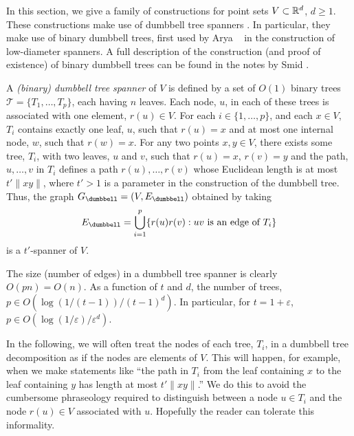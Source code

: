 \documentclass{patmorin}
\newcommand{\eps}{\varepsilon}
\begin{document}
In this section, we give a family of constructions for point sets
$V\subset\mathbb{R}^d$, $d\ge 1$.  These constructions make use of dumbbell
tree spanners \cite[Chapter~11]{ns07}.  In particular, they make use
of binary dumbbell trees, first used by Arya \etal\ \cite{admss95} in
the construction of low-diameter spanners.  A full description of the
construction (and proof of existence) of binary dumbbell trees can be
found in the notes by Smid \cite{s12}.

A \emph{(binary) dumbbell tree spanner} of $V$ is defined by a set of
$O(1)$ binary trees $\mathcal{T}=\{T_1,\ldots,T_p\}$, each having $n$
leaves.  Each node, $u$, in each of these trees is associated with one
element, $r(u)\in V$.  For each $i\in\{1,\ldots,p\}$, and each $x\in V$,
$T_i$ contains exactly one leaf, $u$, such that $r(u)=x$ and at most
one internal node, $w$, such that $r(w)=x$.
For any two points $x,y\in V$, there exists some tree, $T_i$,
with two leaves, $u$ and $v$, such that $r(u)=x$, $r(v)=y$ and
the path, $u,\ldots,v$ in $T_i$ defines a path $r(u),\ldots,r(v)$
whose Euclidean length is at most $t'\|xy\|$, where $t'>1$ is a
parameter in the construction of the dumbbell tree.  Thus, the graph
$G_\dumbbell=(V,E_\dumbbell)$ obtained by taking
\[
   E_\dumbbell = \bigcup_{i=1}^p\{r(u)r(v) : \text{$uv$ is an edge of $T_i$} \}
\]
is a $t'$-spanner of $V$.  

The size (number of edges) in a dumbbell tree spanner is clearly
$O(pn)=O(n)$.  As a function of $t$ and $d$, the number of trees, $p\in O(\log(1/(t-1))/(t-1)^d)$.  In particular, for $t=1+\eps$, $p\in O(\log(1/\eps)/\eps^d)$.


In the following, we will often treat the nodes of each tree, $T_i$,
in a dumbbell tree decomposition as if the nodes are elements of $V$.
This will happen, for example, when we make statements like ``the path in
$T_i$ from the leaf containing $x$ to the leaf containing $y$ has length
at most $t'\|xy\|$.''  We do this to avoid the cumbersome phraseology
required to distinguish between a node $u\in T_i$ and the node $r(u)\in V$
associated with $u$.  Hopefully the reader can tolerate this informality.
\end{document}
